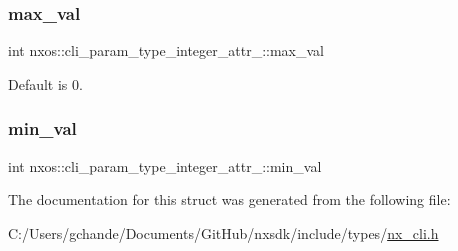 \subsubsection{\texorpdfstring{max\+\_\+val}{max\_val}}
{\footnotesize\ttfamily int nxos\+::cli\+\_\+param\+\_\+type\+\_\+integer\+\_\+attr\+\_\+\+::max\+\_\+val}



Default is 0. 

\mbox{\label{structnxos_1_1cli__param__type__integer__attr___af6129171a34b028c5faeb503e8a1985b}} 
\subsubsection{\texorpdfstring{min\+\_\+val}{min\_val}}
{\footnotesize\ttfamily int nxos\+::cli\+\_\+param\+\_\+type\+\_\+integer\+\_\+attr\+\_\+\+::min\+\_\+val}



The documentation for this struct was generated from the following file\+:\begin{DoxyCompactItemize}
\item 
C\+:/\+Users/gchande/\+Documents/\+Git\+Hub/nxsdk/include/types/\mbox{\hyperlink{types_2nx__cli_8h}{nx\+\_\+cli.\+h}}\end{DoxyCompactItemize}

